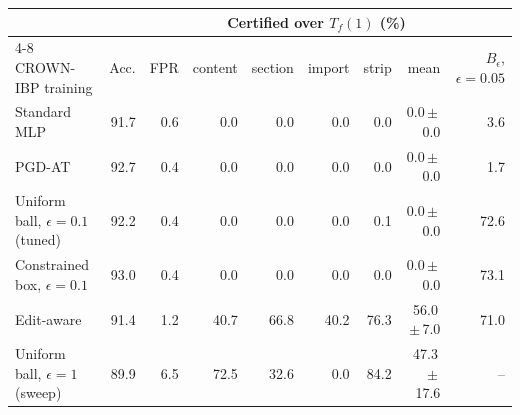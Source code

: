 \begin{tabular}{lrrrrrrrr}
\toprule
 & & & \multicolumn{5}{c}{Certified over $T_f(1)$ (\%)} & \\
\cmidrule(lr){4-8}
CROWN-IBP training & Acc. & FPR & content & section & import & strip & mean & $B_\epsilon$, $\epsilon=0.05$ \\
\midrule
Standard MLP & 91.7 & 0.6 & 0.0 & 0.0 & 0.0 & 0.0 & 0.0\,$\pm$\,0.0 & 3.6 \\
PGD-AT & 92.7 & 0.4 & 0.0 & 0.0 & 0.0 & 0.0 & 0.0\,$\pm$\,0.0 & 1.7 \\
Uniform ball, $\epsilon=0.1$ (tuned) & 92.2 & 0.4 & 0.0 & 0.0 & 0.0 & 0.1 & 0.0\,$\pm$\,0.0 & 72.6 \\
Constrained box, $\epsilon=0.1$ & 93.0 & 0.4 & 0.0 & 0.0 & 0.0 & 0.0 & 0.0\,$\pm$\,0.0 & 73.1 \\
Edit-aware & 91.4 & 1.2 & 40.7 & 66.8 & 40.2 & 76.3 & 56.0\,$\pm$\,7.0 & 71.0 \\
Uniform ball, $\epsilon=1$ (sweep) & 89.9 & 6.5 & 72.5 & 32.6 & 0.0 & 84.2 & 47.3\,$\pm$\,17.6 & -- \\
\bottomrule
\end{tabular}
